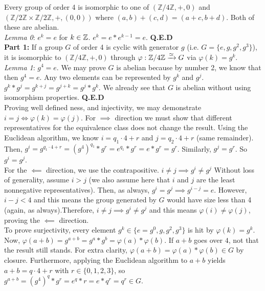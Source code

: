 \documentclass{amsart}
\begin{document}
\begin{enumerate}[itemsep=0.4in]
Every group of order 4 is isomorphic to one of $(\mathbb{Z}/4\mathbb{Z},+,0)$ and $(\mathbb{Z}/2\mathbb{Z}\times\mathbb{Z}/2\mathbb{Z},+,(0,0))$ where $(a,b)+(c,d)=(a+c,b+d)$. Both of these are abelian.\\

\emph{Lemma 0}: $e^k=e$ for $k\in\mathbb{Z}$. $e^k=e*e^{k-1}=e$. \textbf{Q.E.D}\\

\textbf{Part 1:} If a group $G$ of order 4 is cyclic with generator $g$ (i.e. $G=\{e,g,g^2,g^3\}$), it is isomorphic to $(\mathbb{Z}/4\mathbb{Z},+,0)$ through $\varphi:\mathbb{Z}/4\mathbb{Z}\xrightarrow{\simeq} G$ via $\varphi(k)=g^k$.\\

\emph{Lemma 1}: $g^4=e$. We may prove $G$ is abelian because by number 2, we know that then $g^4=e$. Any two elements can be represented by $g^k$ and $g^j$. $g^k*g^j=g^{k+j}=g^{j+k}=g^j*g^k$. We already see that $G$ is abelian without using isomorphism properties. \textbf{Q.E.D}\\

Proving well defined ness, and injectivity, we may demonstrate $i=j\iff \varphi(k)=\varphi(j)$. For $\implies$ direction we must show that different representatives for the equivalence class does not change the result. Using the Euclidean algorithm, we know $i=q_1\cdot4+r$ and $j=q_2\cdot4+r$ (same remainder). Then, $g^i=g^{q_1\cdot4+r}=(g^4)^{q_1}*g^r=e^{q_1}*g^r=e*g^r=g^r$. Similarly, $g^j=g^r$. So $g^i=g^j$.\\

For the $\impliedby$ direction, we use the contrapositive. $i\neq j\implies g^i\neq g^j$ Without loss of generality, assume $i>j$ (we also assume here that $i$ and $j$ are the least nonnegative representatives). Then, as always, $g^i=g^j\implies g^{i-j}=e$. However, $i-j<4$ and this means the group generated by $G$ would have size less than 4 (again, as always).Therefore, $i\neq j\implies g^i\neq g^j$ and this means $\varphi(i)\neq\varphi(j)$, proving the $\impliedby$ direction.\\

To prove surjectivity, every element $g^k\in\{e=g^0,g,g^2,g^3\}$ is hit by $\varphi(k)=g^k$. \\

Now, $\varphi(a+b)=g^{a+b}=g^a*g^b=\varphi(a)*\varphi(b)$. If $a+b$ goes over $4$, not that the result still stands. For extra clarity, $\varphi(a+b)=\varphi(a)*\varphi(b)\in G$ by closure. Furthermore, applying the Euclidean algorithm to $a+b$ yields $a+b=q\cdot4+r$ with $r\in\{0,1,2,3\}$, so $g^{a+b}=(g^4)^q*g^r=e^q*r=e*q^r=q^r\in G$.\\


\end{enumerate}
\end{document}
